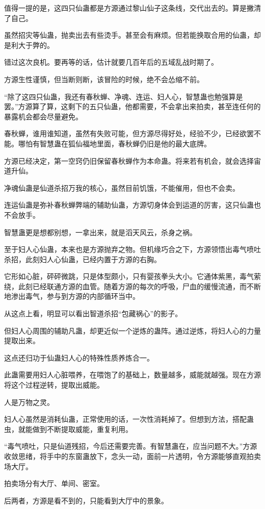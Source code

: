\begin{this_body}
值得一提的是，这四只仙蛊都是方源通过黎山仙子这条线，交代出去的。算是撇清了自己。

虽然招灾等仙蛊，抛卖出去有些烫手。甚至会有麻烦。但若能换取合用的仙蛊，却是利大于弊的。

错过这次良机。要再等的话，估计就要几百年后的五域乱战时期了。

方源生性谨慎，但当断则断，该冒险的时候，绝不会怂缩不前。

“除了这四只仙蛊，我还有春秋蝉、净魂、连运、妇人心，智慧蛊也勉强算是罢。”方源算了算，这剩下的五只仙蛊，他都需要，不会拿出来拍卖，甚至连任何的暴露机会都会尽量避免。

春秋蝉，谁用谁知道，虽然有失败可能，但方源尽得好处，经验不少，已经欲罢不能。哪怕有智慧蛊在狐仙福地里面，春秋蝉仍旧是他的最大底牌。

方源已经决定，第一空窍仍旧保留春秋蝉作为本命蛊。将来若有机会，就会选择宙道升仙。

净魂仙蛊是仙道杀招万我的核心，虽然目前饥饿，不能催用，但也不会卖。

连运仙蛊是弥补春秋蝉弊端的辅助仙蛊，方源切身体会到运道的厉害，这只仙蛊也不会放手。

智慧蛊更是想都别想，一拿出来，就是滔天风云，杀身之祸。

至于妇人心仙蛊，本来也是方源抛弃之物。但机缘巧合之下，方源领悟出毒气喷吐杀招，此刻妇人心仙蛊，已经内置于方源的右胸。

它形如心脏，砰砰微跳，只是体型颇小，只有婴孩拳头大小。它通体紫黑，毒气萦绕，此刻已经联通方源的血管。随着方源的每次的呼吸，尸血的缓慢流通，而不断地渗出毒气，参与到方源的内部循环当中。

从这点上看，明显可以看出智道杀招“包藏祸心”的影子。

但妇人心周围的辅助凡蛊，却更近似一个逆炼的蛊阵。通过逆炼，将妇人心的力量提取出来。

这点还归功于仙蛊妇人心的特殊性质养炼合一。

此蛊需要用妇人心脏喂养，在喂饱了的基础上，数量越多，威能就越强。现在方源将这个过程逆转，提取出威能。

人是万物之灵。

妇人心虽然是消耗仙蛊，正常使用的话，一次性消耗掉了。但想到方法，搭配蛊虫，就能做到不断提取威能，重复利用。

“毒气喷吐，只是仙道残招，今后还需要完善。有智慧蛊在，应当问题不大。”方源收敛思绪，将手中的东窗蛊放下，念头一动，面前一片透明，令方源能够直观拍卖场大厅。

拍卖场分有大厅、单间、密室。

后两者，方源是看不到的，只能看到大厅中的景象。


\end{this_body}
